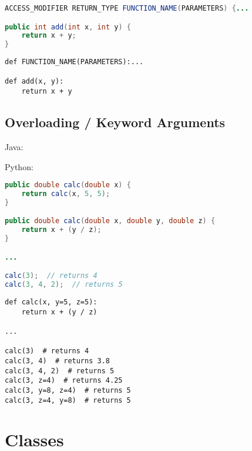 \documentclass{article}
\begin{document}
\begin{minipage}{0.45\linewidth}
    \begin{lstlisting}[language=Java]
ACCESS_MODIFIER RETURN_TYPE FUNCTION_NAME(PARAMETERS) {...

public int add(int x, int y) {
    return x + y;
}
    \end{lstlisting}
\end{minipage}
\hfill
\begin{minipage}{0.45\linewidth}
    \begin{lstlisting}
def FUNCTION_NAME(PARAMETERS):...

def add(x, y):
    return x + y
    \end{lstlisting}
\end{minipage}

\subsection{Overloading / Keyword Arguments}
\begin{minipage}{0.45\linewidth}
    Java:
\end{minipage}
\hfill
\begin{minipage}{0.45\linewidth}
    Python:
\end{minipage}

\begin{minipage}{0.45\linewidth}
    \begin{lstlisting}[language=Java]
public double calc(double x) {
    return calc(x, 5, 5);
}

public double calc(double x, double y, double z) {
    return x + (y / z);
}

...

calc(3);  // returns 4
calc(3, 4, 2);  // returns 5
    \end{lstlisting}
\end{minipage}
\hfill
\begin{minipage}{0.45\linewidth}
    \begin{lstlisting}
def calc(x, y=5, z=5):
    return x + (y / z)

...

calc(3)  # returns 4
calc(3, 4)  # returns 3.8
calc(3, 4, 2)  # returns 5
calc(3, z=4)  # returns 4.25
calc(3, y=8, z=4)  # returns 5
calc(3, z=4, y=8)  # returns 5
    \end{lstlisting}
\end{minipage}

\section{Classes}
\end{document}
